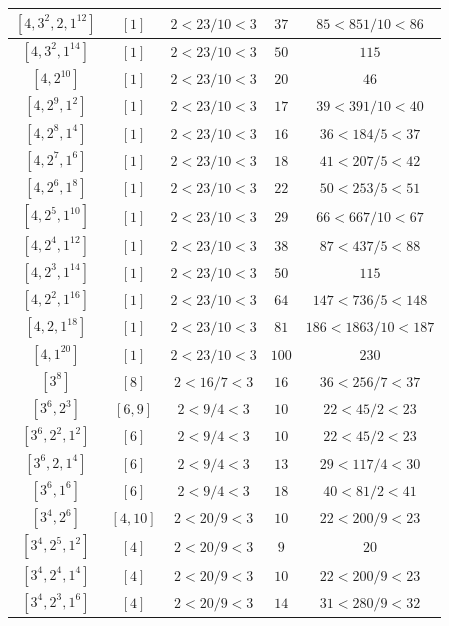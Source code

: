 \documentclass{article}%
\begin{document}
\begin{center}
\begin{longtable}{||c|c|c|c|c||}
$[4, 3^{2}, 2, 1^{12}]$ & $[1]$ & $2 < 23/10 < 3$ & $37$ & $85 < 851/10 < 86$ \\ \hline 
$[4, 3^{2}, 1^{14}]$ & $[1]$ & $2 < 23/10 < 3$ & $50$ & $115$ \\ \hline 
$[4, 2^{10}]$ & $[1]$ & $2 < 23/10 < 3$ & $20$ & $46$ \\ \hline 
$[4, 2^{9}, 1^{2}]$ & $[1]$ & $2 < 23/10 < 3$ & $17$ & $39 < 391/10 < 40$ \\ \hline 
$[4, 2^{8}, 1^{4}]$ & $[1]$ & $2 < 23/10 < 3$ & $16$ & $36 < 184/5 < 37$ \\ \hline 
$[4, 2^{7}, 1^{6}]$ & $[1]$ & $2 < 23/10 < 3$ & $18$ & $41 < 207/5 < 42$ \\ \hline 
$[4, 2^{6}, 1^{8}]$ & $[1]$ & $2 < 23/10 < 3$ & $22$ & $50 < 253/5 < 51$ \\ \hline 
$[4, 2^{5}, 1^{10}]$ & $[1]$ & $2 < 23/10 < 3$ & $29$ & $66 < 667/10 < 67$ \\ \hline 
$[4, 2^{4}, 1^{12}]$ & $[1]$ & $2 < 23/10 < 3$ & $38$ & $87 < 437/5 < 88$ \\ \hline 
$[4, 2^{3}, 1^{14}]$ & $[1]$ & $2 < 23/10 < 3$ & $50$ & $115$ \\ \hline 
$[4, 2^{2}, 1^{16}]$ & $[1]$ & $2 < 23/10 < 3$ & $64$ & $147 < 736/5 < 148$ \\ \hline 
$[4, 2, 1^{18}]$ & $[1]$ & $2 < 23/10 < 3$ & $81$ & $186 < 1863/10 < 187$ \\ \hline 
$[4, 1^{20}]$ & $[1]$ & $2 < 23/10 < 3$ & $100$ & $230$ \\ \hline 
$[3^{8}]$ & $[8]$ & $2 < 16/7 < 3$ & $16$ & $36 < 256/7 < 37$ \\ \hline 
$[3^{6}, 2^{3}]$ & $[6, 9]$ & $2 < 9/4 < 3$ & $10$ & $22 < 45/2 < 23$ \\ \hline 
$[3^{6}, 2^{2}, 1^{2}]$ & $[6]$ & $2 < 9/4 < 3$ & $10$ & $22 < 45/2 < 23$ \\ \hline 
$[3^{6}, 2, 1^{4}]$ & $[6]$ & $2 < 9/4 < 3$ & $13$ & $29 < 117/4 < 30$ \\ \hline 
$[3^{6}, 1^{6}]$ & $[6]$ & $2 < 9/4 < 3$ & $18$ & $40 < 81/2 < 41$ \\ \hline 
$[3^{4}, 2^{6}]$ & $[4, 10]$ & $2 < 20/9 < 3$ & $10$ & $22 < 200/9 < 23$ \\ \hline 
$[3^{4}, 2^{5}, 1^{2}]$ & $[4]$ & $2 < 20/9 < 3$ & $9$ & $20$ \\ \hline 
$[3^{4}, 2^{4}, 1^{4}]$ & $[4]$ & $2 < 20/9 < 3$ & $10$ & $22 < 200/9 < 23$ \\ \hline 
$[3^{4}, 2^{3}, 1^{6}]$ & $[4]$ & $2 < 20/9 < 3$ & $14$ & $31 < 280/9 < 32$ \\ \hline 

\end{longtable}
\end{center}
\end{document}
